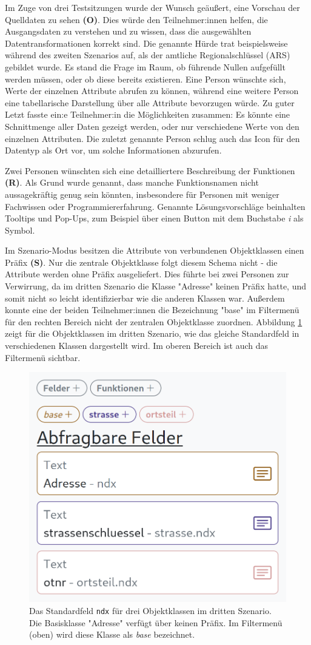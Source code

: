 Im Zuge von drei Testsitzungen wurde der Wunsch geäußert, eine Vorschau der Quelldaten zu sehen \textbf{(O)}. Dies würde den Teilnehmer:innen helfen, die Ausgangsdaten zu verstehen und zu wissen, dass die ausgewählten Datentransformationen korrekt sind. Die genannte Hürde trat beispielsweise während des zweiten Szenarios auf, als der amtliche Regionalschlüssel (\acs{ARS}) gebildet wurde. Es stand die Frage im Raum, ob führende Nullen aufgefüllt werden müssen, oder ob diese bereits existieren. Eine Person wünschte sich, Werte der einzelnen Attribute abrufen zu können, während eine weitere Person eine tabellarische Darstellung über alle Attribute bevorzugen würde. Zu guter Letzt fasste ein:e Teilnehmer:in die Möglichkeiten zusammen: Es könnte eine Schnittmenge aller Daten gezeigt werden, oder nur verschiedene Werte von den einzelnen Attributen. Die zuletzt genannte Person schlug auch das Icon für den Datentyp als Ort vor, um solche Informationen abzurufen.

Zwei Personen wünschten sich eine detailliertere Beschreibung der Funktionen \textbf{(R)}. Als Grund wurde genannt, dass manche Funktionsnamen nicht aussagekräftig genug sein könnten, insbesondere für Personen mit weniger Fachwissen oder Programmiererfahrung. Genannte Lösungsvorschläge beinhalten Tooltips und Pop-Ups, zum Beispiel über einen Button mit dem Buchstabe \textit{i} als Symbol.

Im Szenario-Modus besitzen die Attribute von verbundenen Objektklassen einen Präfix \textbf{(S)}. Nur die zentrale Objektklasse folgt diesem Schema nicht - die Attribute werden ohne Präfix ausgeliefert. Dies führte bei zwei Personen zur Verwirrung, da im dritten Szenario die Klasse "Adresse" keinen Präfix hatte, und somit nicht so leicht identifizierbar wie die anderen Klassen war. Außerdem konnte eine der beiden Teilnehmer:innen die Bezeichnung "base" im Filtermenü für den rechten Bereich nicht der zentralen Objektklasse zuordnen. Abbildung \ref{fig:scenario-prefixes} zeigt für die Objektklassen im dritten Szenario, wie das gleiche Standardfeld in verschiedenen Klassen dargestellt wird. Im oberen Bereich ist auch das Filtermenü sichtbar.

\begin{figure}[!ht]
  \centering
  \includegraphics[width=.425\textwidth]{assets/scenario-prefixes.png}
  \caption[Darstellung des Standardfelds \texttt{ndx} für drei Objektklassen im dritten Szenario]{Das Standardfeld \texttt{ndx} für drei Objektklassen im dritten Szenario. Die Basisklasse "Adresse" verfügt über keinen Präfix. Im Filtermenü (oben) wird diese Klasse als \textit{base} bezeichnet.}
  \label{fig:scenario-prefixes}
\end{figure}


